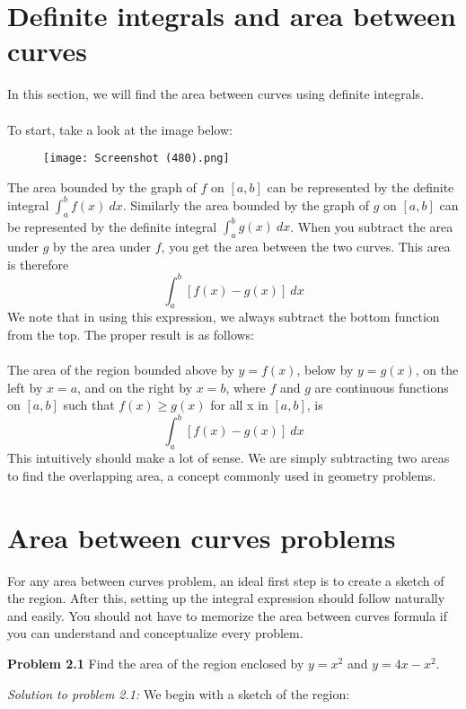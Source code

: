 \documentclass[11pt]{scrartcl}
\begin{document}
\maketitle
\noindent 

\section{Definite integrals and area between curves}
\noindent
In this section, we will find the area between curves using definite integrals. \\
\\
\noindent 
To start, take a look at the image below: 

\begin{figure}[htp]
    \centering
    \texttt{[image: Screenshot (480).png]}
    
\end{figure}
\noindent 
The area bounded by the graph of $f$ on $[a,b]$ can be represented by the definite integral $\int_{a}^{b} f(x) \ dx$. Similarly the area bounded by the graph of $g$ on $[a,b]$ can be represented by the definite integral $\int_a^b g(x) \ dx$. When you subtract the area under $g$ by the area under $f$, you get the area between the two curves. This area is therefore 
$$\int_a^b {[f(x)-g(x)]} \ dx$$
We note that in using this expression, we always subtract the bottom function from the top. The proper result is as follows: \\
\\
\noindent 
The area of the region bounded above by $y=f(x)$, below by $y=g(x)$, on the left by $x=a$, and on the right by $x=b$, where $f$ and $g$ are continuous functions on $[a,b]$ such that $f(x)\ge g(x)$ for all x in $[a,b]$, is 
$$\int_a^b [f(x)-g(x)] \ dx$$
\noindent 
This intuitively should make a lot of sense. We are simply subtracting two areas to find the overlapping area, a concept commonly used in geometry problems. 
\section{Area between curves problems}
\noindent 
For any area between curves problem, an ideal first step is to create a sketch of the region. After this, setting up the integral expression should follow naturally and easily. You should not have to memorize the area between curves formula if you can understand and conceptualize every problem. 
\begin{tcolorbox}[colback=purple!5!white,colframe=purple!75!black]
\textbf{Problem 2.1} Find the area of the region enclosed by $y=x^2$ and $y=4x-x^2$. 
\end{tcolorbox}
\noindent 
\textit{Solution to problem 2.1:} We begin with a sketch of the region: 
\end{document}
